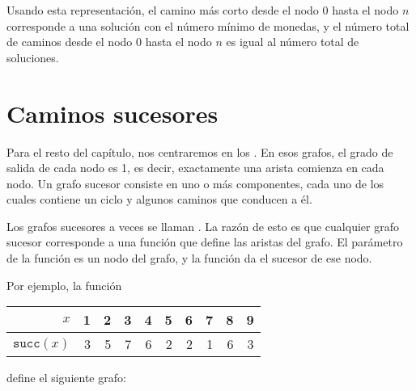 Usando esta representación,
el camino más corto desde el nodo 0 hasta el nodo $n$
corresponde a una solución con el número mínimo de monedas,
y el número total de caminos desde el nodo 0 hasta el nodo $n$
es igual al número total de soluciones.

\section{Caminos sucesores}


Para el resto del capítulo,
nos centraremos en los .
En esos grafos,
el grado de salida de cada nodo es 1, es decir,
exactamente una arista comienza en cada nodo.
Un grafo sucesor consiste en uno o más
componentes, cada uno de los cuales contiene
un ciclo y algunos caminos que conducen a él.

Los grafos sucesores a veces se llaman
.
La razón de esto es que cualquier grafo sucesor
corresponde a una función que define
las aristas del grafo.
El parámetro de la función es un nodo del grafo,
y la función da el sucesor de ese nodo.

Por ejemplo, la función
\begin{center}
\begin{tabular}{r|rrrrrrrrr}
$x$ & 1 & 2 & 3 & 4 & 5 & 6 & 7 & 8 & 9 \\
\hline
$\texttt{succ}(x)$ & 3 & 5 & 7 & 6 & 2 & 2 & 1 & 6 & 3 \\
\end{tabular}
\end{center}
define el siguiente grafo:
\begin{center}
\end{center}

